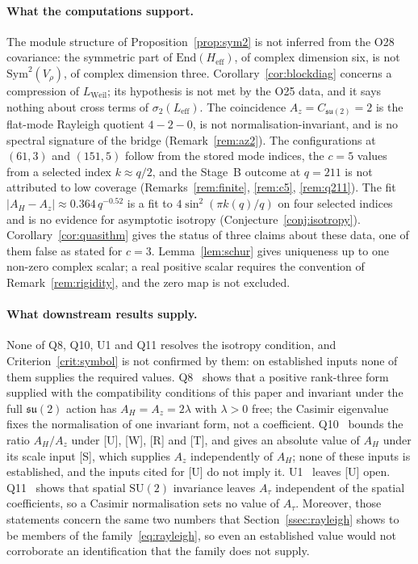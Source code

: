 \documentclass[11pt,a4paper]{article}
\newcommand{\Heff}{H_{\mathrm{eff}}}
\newcommand{\su}{\mathfrak{su}}
\newcommand{\Vr}{V_\rho}
\newcommand{\Sym}{\mathrm{Sym}}
\begin{document}
    \paragraph{What the computations support.}
      The module structure of Proposition~\ref{prop:sym2} is not inferred from the O28 covariance:
      the symmetric part of $\mathrm{End}(\Heff)$, of complex dimension six, is not $\Sym^2(\Vr)$,
      of complex dimension three.
      Corollary~\ref{cor:blockdiag} concerns a compression of $L_{\mathrm{Weil}}$; its hypothesis is
      not met by the O25 data, and it says nothing about cross terms of $\sigma_2(L_{\mathrm{eff}})$.
      The coincidence $A_z = C_{\mathfrak{su}(2)} = 2$ is the flat-mode Rayleigh quotient
      $4 - 2 - 0$, is not normalisation-invariant, and is no spectral signature of the bridge
      (Remark~\ref{rem:az2}).
      The configurations at $(61,3)$ and $(151,5)$ follow from the stored mode indices, the $c = 5$
      values from a selected index $k \approx q/2$, and the Stage~B outcome at $q = 211$ is not
      attributed to low coverage (Remarks~\ref{rem:finite}, \ref{rem:c5}, \ref{rem:q211}).
      The fit $|A_H - A_z| \approx 0.364\,q^{-0.52}$ is a fit to $4\sin^2(\pi k(q)/q)$ on four
      selected indices and is no evidence for asymptotic isotropy
      (Conjecture~\ref{conj:isotropy}).
      Corollary~\ref{cor:quasithm} gives the status of three claims about these data, one of them
      false as stated for $c = 3$.
      Lemma~\ref{lem:schur} gives uniqueness up to one non-zero complex scalar; a real positive
      scalar requires the convention of Remark~\ref{rem:rigidity}, and the zero map is not excluded.

    \paragraph{What downstream results supply.}
      None of Q8, Q10, U1 and Q11 resolves the isotropy condition, and Criterion~\ref{crit:symbol}
      is not confirmed by them: on established inputs none of them supplies the required values.
      Q8~\cite{BeauQ8} shows that a positive rank-three form supplied with the compatibility
      conditions of this paper and invariant under the full $\su(2)$ action has
      $A_H = A_z = 2\lambda$ with $\lambda > 0$ free; the Casimir eigenvalue
      fixes the normalisation of one invariant form, not a coefficient.
      Q10~\cite{Beau2026q10} bounds the ratio $A_H/A_z$ under [U], [W], [R] and [T], and gives an
      absolute value of $A_H$ under its scale input [S], which supplies $A_z$ independently of $A_H$;
      none of these inputs is established, and the inputs cited for [U] do not imply it.
      U1~\cite{Beau2026u1} leaves [U] open.
      Q11~\cite{Beau2026q11} shows that spatial $\mathrm{SU}(2)$ invariance leaves $A_\tau$ independent of the
      spatial coefficients, so a Casimir normalisation sets no value of $A_\tau$.
      Moreover, those statements concern the same two numbers that Section~\ref{ssec:rayleigh} shows
      to be members of the family~\eqref{eq:rayleigh}, so even an established value would not
      corroborate an identification that the family does not supply.
\end{document}
